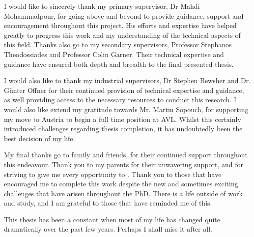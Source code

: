 
\begin{acknowledgements}      

I would like to sincerely thank my primary supervisor, Dr Mahdi Mohammadpour, for going above and beyond to provide guidance, support and encouragement throughout this project. His efforts and expertise have helped greatly to progress this work and my understanding of the technical aspects of this field. Thanks also go to my secondary supervisors, Professor Stephanos Theodossiades and Professor Colin Garner. Their technical expertise and guidance have ensured both depth and breadth to the final presented thesis.

I would also like to thank my industrial supervisors, Dr Stephen Bewsher and Dr. Günter Offner for their continued provision of technical expertise and guidance, as well providing access to the necessary resources to conduct this research. I would also like extend my gratitude towards Mr. Martin Sopouch, for supporting my move to Austria to begin a full time position at AVL. Whilst this certainly introduced challenges regarding thesis completion, it has undoubtedly been the best decision of my life.

My final thanks go to family and friends, for their continued support throughout this endeavour. Thank you to my parents for their unwavering support, and for striving to give me every opportunity to . Thank you to those that have encouraged me to complete this work despite the new and sometimes exciting challenges that have arisen throughout the PhD. There is a life outside of work and study, and I am grateful to those that have reminded me of this.

This thesis has been a constant when most of my life has changed quite dramatically over the past few years. Perhaps I shall miss it after all.

\end{acknowledgements}
